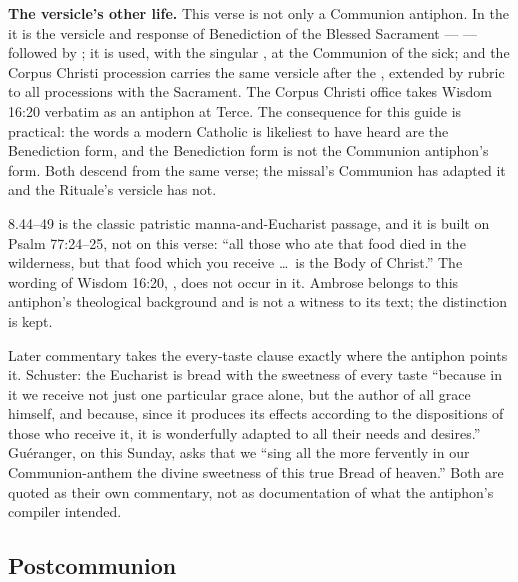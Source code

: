 \textbf{The versicle's other life.} This verse is not only a Communion
antiphon. In the  it is the versicle and response of
Benediction of the Blessed Sacrament ---  --- followed by ; it is used, with the singular
, at the Communion of the sick; and the Corpus Christi
procession carries the same versicle after the , extended by
rubric to all processions with the Sacrament. The Corpus Christi office takes
Wisdom 16:20 verbatim as an antiphon at Terce. The consequence for this guide
is practical: the words a modern Catholic is likeliest to have heard are the
Benediction form, and the Benediction form is not the Communion antiphon's
form. Both descend from the same verse; the missal's Communion has adapted it
and the Rituale's versicle has not.

\begin{witnessnote}
 8.44--49 is the classic patristic manna-and-Eucharist
passage, and it is built on Psalm 77:24--25, not on this verse: ``all those who
ate that food died in the wilderness, but that food which you receive \dots\ is
the Body of Christ.'' The wording of Wisdom 16:20, ,
does not occur in it. Ambrose belongs to this antiphon's theological
background and is not a witness to its text; the distinction is kept.
\end{witnessnote}

Later commentary takes the every-taste clause exactly where the antiphon
points it. Schuster: the Eucharist is bread with the sweetness of every taste
``because in it we receive not just one particular grace alone, but the author
of all grace himself, and because, since it produces its effects according to
the dispositions of those who receive it, it is wonderfully adapted to all
their needs and desires.'' Guéranger, on this Sunday, asks that we ``sing all
the more fervently in our Communion-anthem the divine sweetness of this true
Bread of heaven.'' Both are quoted as their own commentary, not as
documentation of what the antiphon's compiler intended.

\elementguard
\subsection*{Postcommunion }


